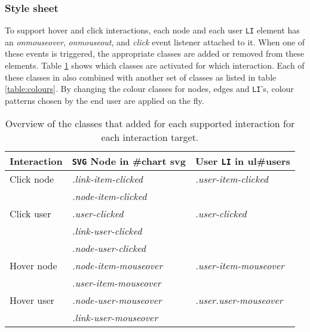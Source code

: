 

\subsubsection{Style sheet}

To support hover and click interactions, each node and each user \texttt{LI} element has an \emph{onmouseover}, \emph{onmouseout}, and \emph{click} event listener attached to it. When one of these events is triggered, the appropriate classes are added or removed from these elements. Table \ref{table:interactions} shows which classes are activated for which interaction. Each of these classes in also combined with another set of classes as listed in table \ref{table:colours}. By changing the colour classes for nodes, edges and \texttt{LI}'s, colour patterns chosen by the end user are applied on the fly.


\begin{table}%
	\begin{center}
		\begin{tabular}{l | l l}
			\hline
			\textbf{Interaction}		& \texttt{SVG} Node in \textbf{\#chart svg} & User \texttt{LI} in \textbf{ul\#users }
			\\
			\hline
			Click node		& \textit{.link-item-clicked} & \textit{.user-item-clicked} \\
										& \textit{.node-item-clicked} & \\
			Click user		& \textit{.user-clicked} 			& \textit{.user-clicked} \\
										& \textit{.link-user-clicked} & \\
										& \textit{.node-user-clicked} & \\
			Hover node		& \textit{.node-item-mouseover} 	& \textit{.user-item-mouseover} \\
										& \textit{.user-item-mouseover}		& \\
			Hover user		& \textit{.node-user-mouseover} 	& \textit{.user.user-mouseover} \\
										& \textit{.link-user-mouseover}		& \\
			\hline
		\end{tabular}
	\end{center}
	\caption{Overview of the classes that added for each supported interaction for each interaction target.}
	\label{table:interactions}
\end{table}


